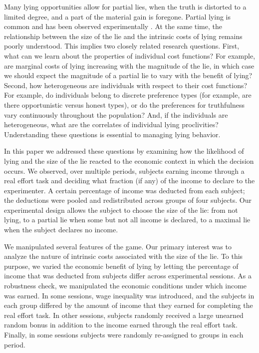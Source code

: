 \documentclass[12pt]{article}
\begin{document}
\par Many lying opportunities allow for partial lies, when the truth is distorted to a limited degree, and a part of the material gain is foregone. Partial lying is common and has been observed experimentally \citep{Fischbacheretal2013,gneezy2018lying}.
At the same time, the relationship between the size of the lie and the intrinsic costs of lying remains poorly understood. This implies two closely related research questions. First, what can we learn about the properties of individual cost functions? For example, are marginal costs of lying increasing with the magnitude of the lie, in which case we should expect the magnitude of a partial lie to vary with the benefit of lying? Second, how heterogeneous are individuals with respect to their cost functions? For example, do individuals belong to discrete preference types (for example, are there opportunistic versus honest types), or do the preferences for truthfulness vary continuously throughout the population?\footnotemark{} 
And, if the individuals are heterogeneous, what are the correlates of individual lying proclivities?
Understanding these questions is essential to managing lying behavior.  

\par In this paper we addressed these questions by examining how the likelihood of lying and the size of the lie reacted to the economic context in which the decision occurs. We observed, over multiple periods, subjects earning income through a real effort task and deciding what fraction (if any) of the income to declare to the experimenter. A certain percentage of income was deducted from each subject; the deductions were pooled and redistributed across groups of four subjects. Our experimental design allows the subject to choose the size of the lie: from not lying, to a partial lie when some but not all income is declared, to a maximal lie when the subject declares no income.  
\par We manipulated several features of the game. Our primary interest was to analyze the nature of intrinsic costs associated with the size of the lie. To this purpose, we varied the economic benefit of lying by letting the percentage of income that was deducted from subjects differ across experimental sessions. As a robustness check, we manipulated the economic conditions under which income was earned. In some sessions, wage inequality was introduced, and the subjects in each group differed by the amount of income that they earned for completing the real effort task. In other sessions, subjects randomly received a large unearned random bonus in addition to the income earned through the real effort task. Finally, in some sessions subjects were randomly re-assigned to groups in each period. 
\end{document}
